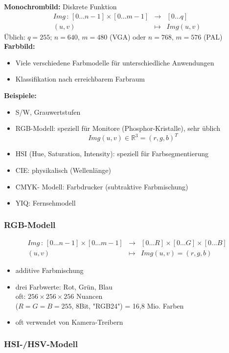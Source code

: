 \textbf{Monochrombild:} Diskrete Funktion
\begin{eqnarray*}
Img \, : \, [0 \dots n-1] \times [0 \dots m-1] &\to& [0 \dots q] \\ (u,v) &\mapsto& Img(u,v)
\end{eqnarray*}
Üblich: $q = 255$; $n = 640$, $m=480$ (VGA) oder $n = 768$, $m=576$ (PAL) \\[0,1cm]
\textbf{Farbbild:}
\begin{itemize}
\item Viele verschiedene Farbmodelle für unterschiedliche Anwendungen
\item Klassifikation nach erreichbarem Farbraum
\end{itemize}
\textbf{Beispiele:}
\begin{itemize}
\item S/W, Grauwertstufen
\item RGB-Modell: speziell für Monitore (Phosphor-Kristalle), sehr üblich $$Img(u,v) \in \mathbb{R}^3 = (r,g,b)^T$$
\item HSI (Hue, Saturation, Intensity): speziell für Farbsegmentierung
\item CIE: physikalisch (Wellenlänge)
\item CMYK- Modell: Farbdrucker (subtraktive Farbmischung)
\item YIQ: Fernsehmodell
\end{itemize}

\subsubsection*{RGB-Modell}

\begin{eqnarray*}
Img \, : \, [0 \dots n-1] \times [0 \dots m-1] &\to& [0 \dots R] \times [0 \dots G] \times [0 \dots B] \\ (u,v) &\mapsto& Img(u,v) = (r,g,b)
\end{eqnarray*}
\begin{itemize}
\item additive Farbmischung
\item drei Farbwerte: Rot, Grün, Blau \\ oft: $256 \times 256 \times 256$ Nuancen \\ ($R=G=B=255$, 8Bit, "{}RGB24"{}) = 16,8 Mio. Farben
\item oft verwendet von Kamera-Treibern
\end{itemize}

\subsubsection*{HSI-/HSV-Modell}

